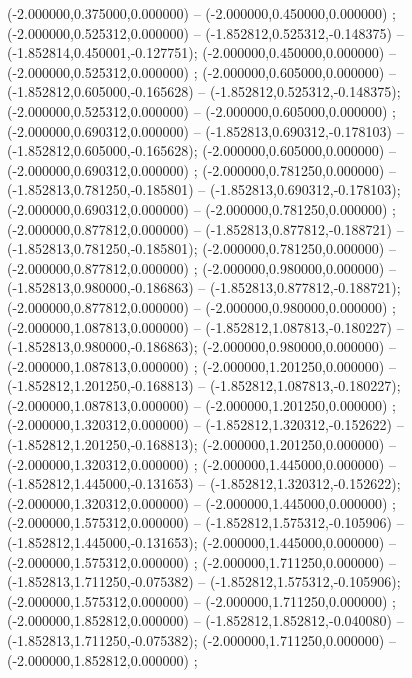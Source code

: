  (-2.000000,0.375000,0.000000) -- (-2.000000,0.450000,0.000000) ;
 (-2.000000,0.525312,0.000000) -- (-1.852812,0.525312,-0.148375) -- (-1.852814,0.450001,-0.127751);
 (-2.000000,0.450000,0.000000) -- (-2.000000,0.525312,0.000000) ;
 (-2.000000,0.605000,0.000000) -- (-1.852812,0.605000,-0.165628) -- (-1.852812,0.525312,-0.148375);
 (-2.000000,0.525312,0.000000) -- (-2.000000,0.605000,0.000000) ;
 (-2.000000,0.690312,0.000000) -- (-1.852813,0.690312,-0.178103) -- (-1.852812,0.605000,-0.165628);
 (-2.000000,0.605000,0.000000) -- (-2.000000,0.690312,0.000000) ;
 (-2.000000,0.781250,0.000000) -- (-1.852813,0.781250,-0.185801) -- (-1.852813,0.690312,-0.178103);
 (-2.000000,0.690312,0.000000) -- (-2.000000,0.781250,0.000000) ;
 (-2.000000,0.877812,0.000000) -- (-1.852813,0.877812,-0.188721) -- (-1.852813,0.781250,-0.185801);
 (-2.000000,0.781250,0.000000) -- (-2.000000,0.877812,0.000000) ;
 (-2.000000,0.980000,0.000000) -- (-1.852813,0.980000,-0.186863) -- (-1.852813,0.877812,-0.188721);
 (-2.000000,0.877812,0.000000) -- (-2.000000,0.980000,0.000000) ;
 (-2.000000,1.087813,0.000000) -- (-1.852812,1.087813,-0.180227) -- (-1.852813,0.980000,-0.186863);
 (-2.000000,0.980000,0.000000) -- (-2.000000,1.087813,0.000000) ;
 (-2.000000,1.201250,0.000000) -- (-1.852812,1.201250,-0.168813) -- (-1.852812,1.087813,-0.180227);
 (-2.000000,1.087813,0.000000) -- (-2.000000,1.201250,0.000000) ;
 (-2.000000,1.320312,0.000000) -- (-1.852812,1.320312,-0.152622) -- (-1.852812,1.201250,-0.168813);
 (-2.000000,1.201250,0.000000) -- (-2.000000,1.320312,0.000000) ;
 (-2.000000,1.445000,0.000000) -- (-1.852812,1.445000,-0.131653) -- (-1.852812,1.320312,-0.152622);
 (-2.000000,1.320312,0.000000) -- (-2.000000,1.445000,0.000000) ;
 (-2.000000,1.575312,0.000000) -- (-1.852812,1.575312,-0.105906) -- (-1.852812,1.445000,-0.131653);
 (-2.000000,1.445000,0.000000) -- (-2.000000,1.575312,0.000000) ;
 (-2.000000,1.711250,0.000000) -- (-1.852813,1.711250,-0.075382) -- (-1.852812,1.575312,-0.105906);
 (-2.000000,1.575312,0.000000) -- (-2.000000,1.711250,0.000000) ;
 (-2.000000,1.852812,0.000000) -- (-1.852812,1.852812,-0.040080) -- (-1.852813,1.711250,-0.075382);
 (-2.000000,1.711250,0.000000) -- (-2.000000,1.852812,0.000000) ;
